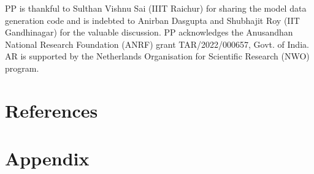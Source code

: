 \documentclass[aps, prd, showpacs, floatfix, superscriptaddress, twocolumn, nofootinbib, preprintnumbers, longbibliography]{revtex4-2}
\begin{document}
\begin{acknowledgments}
PP is thankful to Sulthan Vishnu Sai (IIIT Raichur) for sharing the model data generation code and is indebted to Anirban Dasgupta and Shubhajit Roy (IIT Gandhinagar) for the valuable discussion. 
PP acknowledges the Anusandhan National Research Foundation (ANRF) grant TAR/2022/000657, Govt. of India. AR is supported by the Netherlands Organisation for Scientific Research (NWO) program.
\end{acknowledgments}

\vspace{1 cm}
\section*{References}


\section{Appendix}
%
\end{document}

